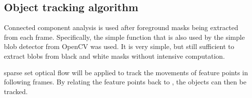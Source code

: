 \subsection{Object tracking algorithm}

Connected component analysis is used after foreground masks being extracted from each frame. Specifically, the simple  function that is also used by the simple blob detector from OpenCV was used. It is very simple, but still sufficient to extract blobs from black and white masks without intensive computation.


 sparse set optical flow will be applied to track the movements of feature points in following frames. By relating the feature points back to , the objects can then be tracked.

